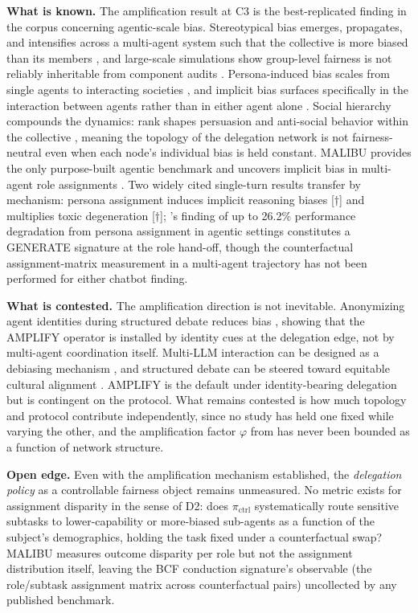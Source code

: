 \documentclass[acmsmall,nonacm]{acmart}
\begin{document}
\textbf{What is known.} The amplification result at C3 is the best-replicated finding in the corpus concerning agentic-scale bias. Stereotypical bias emerges, propagates, and intensifies across a multi-agent system such that the collective is more biased than its members \cite{nguyen2025social}, and large-scale simulations show group-level fairness is not reliably inheritable from component audits \cite{madigan2025emergent}. Persona-induced bias scales from single agents to interacting societies \cite{li2025from}, and implicit bias surfaces specifically in the interaction between agents rather than in either agent alone \cite{borah2024implicit}. Social hierarchy compounds the dynamics: rank shapes persuasion and anti-social behavior within the collective \cite{campedelli2024want}, meaning the topology of the delegation network is not fairness-neutral even when each node's individual bias is held constant. MALIBU provides the only purpose-built agentic benchmark and uncovers implicit bias in multi-agent role assignments \cite{mirza2025malibu}. Two widely cited single-turn results transfer by mechanism: persona assignment induces implicit reasoning biases \cite{gupta2023bias}[$\dagger$] and multiplies toxic degeneration \cite{deshpande2023toxicity}[$\dagger$]; \cite{cao2026from}'s finding of up to 26.2\% performance degradation from persona assignment in agentic settings constitutes a GENERATE signature at the role hand-off, though the counterfactual assignment-matrix measurement in a multi-agent trajectory has not been performed for either chatbot finding.

\textbf{What is contested.} The amplification direction is not inevitable. Anonymizing agent identities during structured debate reduces bias \cite{choi2025identity}, showing that the AMPLIFY operator is installed by identity cues at the delegation edge, not by multi-agent coordination itself. Multi-LLM interaction can be designed as a debiasing mechanism \cite{owens2024multi}, and structured debate can be steered toward equitable cultural alignment \cite{ki2025multiple}. AMPLIFY is the default under identity-bearing delegation but is contingent on the protocol. What remains contested is how much topology and protocol contribute independently, since no study has held one fixed while varying the other, and the amplification factor $\varphi$ from \cite{nguyen2025social} has never been bounded as a function of network structure.

\textbf{Open edge.} Even with the amplification mechanism established, the \emph{delegation policy} as a controllable fairness object remains unmeasured. No metric exists for assignment disparity in the sense of D2: does $\pi_{\mathrm{ctrl}}$ systematically route sensitive subtasks to lower-capability or more-biased sub-agents as a function of the subject's demographics, holding the task fixed under a counterfactual swap? MALIBU measures outcome disparity per role but not the assignment distribution itself, leaving the BCF conduction signature's observable (the role/subtask assignment matrix across counterfactual pairs) uncollected by any published benchmark.
\end{document}
